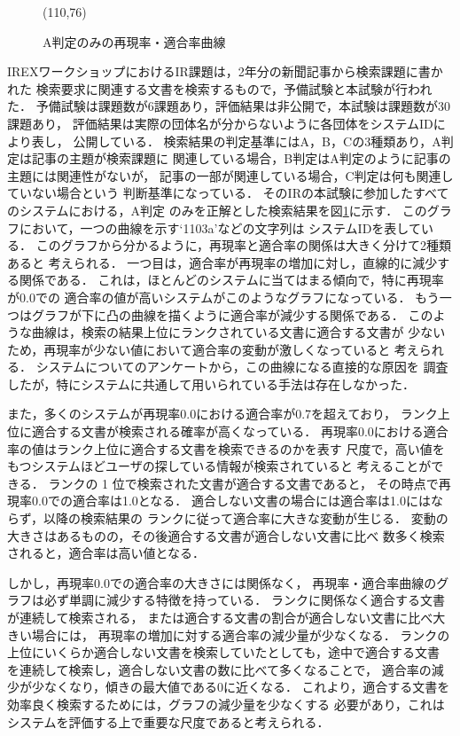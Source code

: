 \begin{figure}[t]
	\begin{center}
                \atari(110,76)
		
	\end{center}
	\caption{A判定のみの再現率・適合率曲線}
	\label{re_pre}
\end{figure}
IREXワークショップにおけるIR課題は，2年分の新聞記事から検索課題に書かれた
検索要求に関連する文書を検索するもので，予備試験と本試験が行われた．
予備試験は課題数が6課題あり，評価結果は非公開で，本試験は課題数が30課題あり，
評価結果は実際の団体名が分からないように各団体をシステムIDにより表し，
公開している．
検索結果の判定基準にはA，B，Cの3種類あり，A判定は記事の主題が検索課題に
関連している場合，B判定はA判定のように記事の主題には関連性がないが，
記事の一部が関連している場合，C判定は何も関連していない場合という
判断基準になっている．
そのIRの本試験に参加したすべてのシステムにおける，A判定
のみを正解とした検索結果を図\ref{re_pre}に示す．
このグラフにおいて，一つの曲線を示す`1103a'などの文字列は
システムIDを表している．
このグラフから分かるように，再現率と適合率の関係は大きく分けて2種類あると
考えられる．
一つ目は，適合率が再現率の増加に対し，直線的に減少する関係である．
これは，ほとんどのシステムに当てはまる傾向で，特に再現率が0.0での
適合率の値が高いシステムがこのようなグラフになっている．
もう一つはグラフが下に凸の曲線を描くように適合率が減少する関係である．
このような曲線は，検索の結果上位にランクされている文書に適合する文書が
少ないため，再現率が少ない値において適合率の変動が激しくなっていると
考えられる．
システムについてのアンケートから，この曲線になる直接的な原因を
調査したが，特にシステムに共通して用いられている手法は存在しなかった．

また，多くのシステムが再現率0.0における適合率が0.7を超えており，
ランク上位に適合する文書が検索される確率が高くなっている．
再現率0.0における適合率の値はランク上位に適合する文書を検索できるのかを表す
尺度で，高い値をもつシステムほどユーザの探している情報が検索されていると
考えることができる．
ランクの 1 位で検索された文書が適合する文書であると，
その時点で再現率0.0での適合率は1.0となる．
適合しない文書の場合には適合率は1.0にはならず，以降の検索結果の
ランクに従って適合率に大きな変動が生じる．
変動の大きさはあるものの，その後適合する文書が適合しない文書に比べ
数多く検索されると，適合率は高い値となる．

しかし，再現率0.0での適合率の大きさには関係なく，
再現率・適合率曲線のグラフは必ず単調に減少する特徴を持っている．
ランクに関係なく適合する文書が連続して検索される，
または適合する文書の割合が適合しない文書に比べ大きい場合には，
再現率の増加に対する適合率の減少量が少なくなる．
ランクの上位にいくらか適合しない文書を検索していたとしても，途中で適合する文書
を連続して検索し，適合しない文書の数に比べて多くなることで，
適合率の減少が少なくなり，傾きの最大値である0に近くなる．
これより，適合する文書を効率良く検索するためには，グラフの減少量を少なくする
必要があり，これはシステムを評価する上で重要な尺度であると考えられる．

